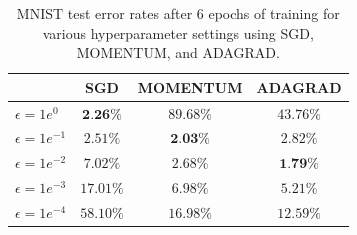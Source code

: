 \documentclass{article}
\begin{document}
\begin{table}[b!]
\small
\vspace*{-0mm}
\begin{center}
\begin{tabular}{|l|c|c|c|}
  \hline
  & SGD & MOMENTUM & ADAGRAD \\
   \hline
  $\epsilon = 1e^{0}$ & $\textbf{2.26\%}$ & $89.68\%$ & $43.76\%$ \\
   \hline
  $\epsilon = 1e^{-1}$ & $2.51\%$ & $\textbf{2.03\%}$ & $2.82\%$ \\
   \hline
  $\epsilon = 1e^{-2}$ & $7.02\%$ & $2.68\%$ & $\textbf{1.79\%}$ \\
   \hline
  $\epsilon = 1e^{-3}$ & $17.01\%$ & $6.98\%$ & $5.21\%$ \\
   \hline
  $\epsilon = 1e^{-4}$ & $58.10\%$ & $16.98\%$ & $12.59\%$ \\
   \hline
\end{tabular}
\vspace*{1mm}
\caption{MNIST test error rates after 6 epochs of training for various hyperparameter settings using
  SGD,  MOMENTUM, and ADAGRAD.}
\label{tab:other_hyper}
\vspace*{-5mm}
\end{center}
\end{table}
\end{document}
